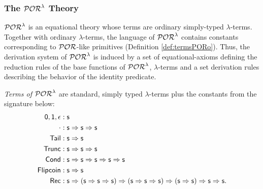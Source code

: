 \subsubsection{The $\mathcal{POR}^\lambda$ Theory}

$\mathcal{POR}^\lambda$ is an equational theory whose terms are ordinary
simply-typed $\lambda$-terms. Together with ordinary $\lambda$-terms,
the language of $\mathcal{POR}^\lambda$ contains constants
corresponding to $\mathcal{POR}$-like primitives (Definition \ref{def:termsPORo}).
Thus, the derivation system of $\mathcal{POR}^\lambda$ is
induced by a set of equational-axioms defining the reduction rules of the base functions of $\mathcal{POR}^\lambda$, $\lambda$-terms and a set derivation rules describing the
behavior of the identity predicate.


\begin{defn}\label{def:termsPORo}
\emph{Terms of $\mathcal{POR}^\lambda$}
are standard, simply typed
$\lambda$-terms plus the
constants from the signature below:
\begin{align*}
\mathsf{0}, \mathsf{1}, \mathsf{\epsilon} &: \mathsf{s} \\
\cdot &: \mathsf{s} \Rightarrow \mathsf{s} \Rightarrow \mathsf{s} \\
\mathsf{Tail} &: \mathsf{s} \Rightarrow \mathsf{s} \\
\mathsf{Trunc} &: \mathsf{s} \Rightarrow \mathsf{s} \Rightarrow \mathsf{s} \\
\mathsf{Cond} &: \mathsf{s} \Rightarrow \mathsf{s} \Rightarrow \mathsf{s} \Rightarrow \mathsf{s} \Rightarrow \mathsf{s} \\
\mathsf{Flipcoin} &: \mathsf{s} \Rightarrow \mathsf{s} \\
\mathsf{Rec} &: \mathsf{s} \Rightarrow (\mathsf{s} \Rightarrow \mathsf{s} \Rightarrow \mathsf{s})
\Rightarrow (\mathsf{s} \Rightarrow \mathsf{s} \Rightarrow \mathsf{s}) \Rightarrow
(\mathsf{s} \Rightarrow \mathsf{s}) \Rightarrow \mathsf{s} \Rightarrow \mathsf{s}.
\end{align*}
\end{defn}
%
%
\noindent
